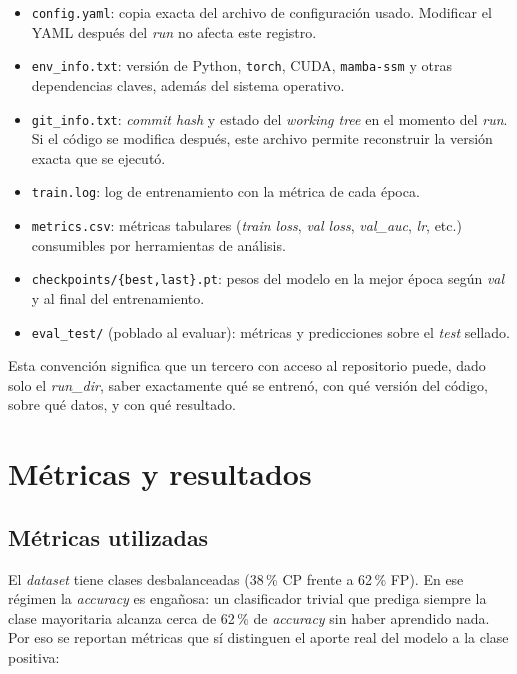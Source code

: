 \documentclass[11pt,a4paper]{article}
\begin{document}
\begin{itemize}
  \item \texttt{config.yaml}: copia exacta del archivo de
    configuración usado. Modificar el YAML después del \textit{run} no
    afecta este registro.
  \item \texttt{env\_info.txt}: versión de Python, \texttt{torch},
    CUDA, \texttt{mamba-ssm} y otras dependencias claves, además del
    sistema operativo.
  \item \texttt{git\_info.txt}: \textit{commit hash} y estado del
    \textit{working tree} en el momento del \textit{run}. Si el
    código se modifica después, este archivo permite reconstruir la
    versión exacta que se ejecutó.
  \item \texttt{train.log}: log de entrenamiento con la métrica de
    cada época.
  \item \texttt{metrics.csv}: métricas tabulares (\textit{train
    loss}, \textit{val loss}, \textit{val\_auc}, \textit{lr}, etc.)
    consumibles por herramientas de análisis.
  \item \texttt{checkpoints/\{best,last\}.pt}: pesos del modelo en
    la mejor época según \textit{val} y al final del entrenamiento.
  \item \texttt{eval\_test/} (poblado al evaluar): métricas y
    predicciones sobre el \textit{test} sellado.
\end{itemize}

Esta convención significa que un tercero con acceso al repositorio
puede, dado solo el \textit{run\_dir}, saber exactamente qué se
entrenó, con qué versión del código, sobre qué datos, y con qué
resultado.

\section{Métricas y resultados}
\label{sec:results}

\subsection{Métricas utilizadas}
\label{subsec:metrics}

El \textit{dataset} tiene clases desbalanceadas (38\,\% CP frente a
62\,\% FP). En ese régimen la \textit{accuracy} es engañosa: un
clasificador trivial que prediga siempre la clase mayoritaria alcanza
cerca de 62\,\% de \textit{accuracy} sin haber aprendido nada. Por eso
se reportan métricas que sí distinguen el aporte real del modelo a la
clase positiva:
\end{document}

